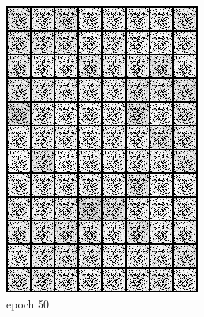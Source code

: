\documentclass[a4paper]{article}
\theoremstyle{definition}
\newenvironment{soln}{
	\leavevmode\color{blue}\ignorespaces
}{}
\begin{document}
\begin{enumerate} [label=(\alph*)]
\begin{soln}
\begin{figure}[H]
\begin{subfigure}[b]{0.3\textwidth}
					\includegraphics[width=\textwidth]{../outputs/gen_img50.png}
					\caption{epoch 50}
				\end{subfigure}
				\hfill
				\begin{subfigure}[b]{0.3\textwidth}
					\centering

\end{subfigure}
\end{figure}
\end{soln}
\end{enumerate}
\end{document}
